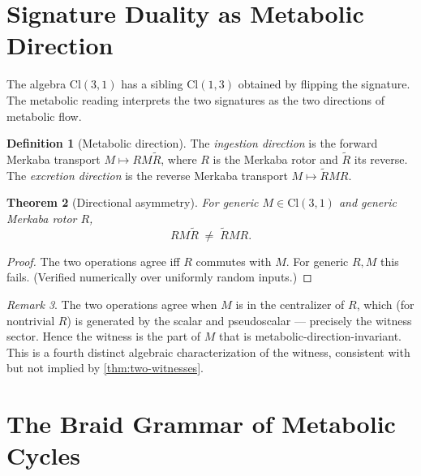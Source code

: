 \documentclass[11pt,a4paper]{article}
\theoremstyle{plain}
\newtheorem{theorem}{Theorem}[section]
\theoremstyle{definition}
\newtheorem{definition}[theorem]{Definition}
\theoremstyle{remark}
\newtheorem{remark}[theorem]{Remark}
\numberwithin{equation}{section}
\providecommand{\Cl}{\mathrm{Cl}}
\begin{document}
\section{Signature Duality as Metabolic Direction}
\label{sec:duality}

The algebra $\Cl(3,1)$ has a sibling $\Cl(1,3)$ obtained by flipping
the signature. The metabolic reading interprets the two signatures
as the two directions of metabolic flow.

\begin{definition}[Metabolic direction]
\label{def:direction}
The \emph{ingestion direction} is the forward Merkaba transport
$M \mapsto R M \tilde R$, where $R$ is the Merkaba rotor and $\tilde R$
its reverse. The \emph{excretion direction} is the reverse Merkaba
transport $M \mapsto \tilde R M R$.
\end{definition}

\begin{theorem}[Directional asymmetry]
\label{thm:merkaba-asymmetry}
For generic $M \in \Cl(3,1)$ and generic Merkaba rotor $R$,
\[
R M \tilde R \;\ne\; \tilde R M R.
\]
\end{theorem}

\begin{proof}
The two operations agree iff $R$ commutes with $M$. For generic
$R, M$ this fails. (Verified numerically over uniformly random
inputs.)
\end{proof}

\begin{remark}
The two operations agree when $M$ is in the centralizer of $R$,
which (for nontrivial $R$) is generated by the scalar and
pseudoscalar --- precisely the witness sector. Hence the witness
is the part of $M$ that is metabolic-direction-invariant. This is
a fourth distinct algebraic characterization of the witness,
consistent with but not implied by \cref{thm:two-witnesses}.
\end{remark}

\section{The Braid Grammar of Metabolic Cycles}
\label{sec:braid}
\end{document}
